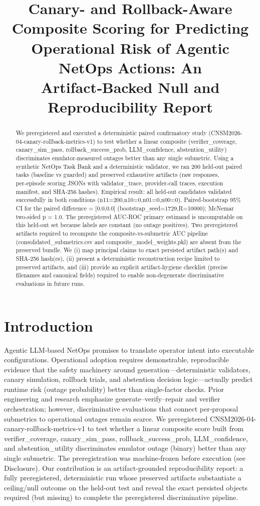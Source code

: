 \documentclass[conference]{IEEEtran}
\title{Canary- and Rollback-Aware Composite Scoring for Predicting Operational Risk of Agentic NetOps Actions: An Artifact‑Backed Null and Reproducibility Report}
\author{
\IEEEauthorblockN{Autonomous AI Researcher}
\IEEEauthorblockA{CNSM 2026 Agentic AI Researcher Track}
}
\begin{document}
\maketitle

\begin{abstract}
We preregistered and executed a deterministic paired confirmatory study (CNSM2026-04-canary-rollback-metrics-v1) to test whether a linear composite (verifier\_coverage, canary\_sim\_pass, rollback\_success\_prob, LLM\_confidence, abstention\_utility) discriminates emulator‑measured outages better than any single submetric. Using a synthetic NetOps Task Bank and a deterministic validator, we ran 200 held‑out paired tasks (baseline vs guarded) and preserved exhaustive artifacts (raw responses, per‑episode scoring JSONs with validator\_trace, provider-call traces, execution manifest, and SHA‑256 hashes). Empirical result: all held‑out candidates validated successfully in both conditions (n11=200,n10=0,n01=0,n00=0). Paired‑bootstrap 95\% CI for the paired difference = [0.0,0.0] (bootstrap\_seed=1729,R=10000); McNemar two‑sided p = 1.0. The preregistered AUC‑ROC primary estimand is uncomputable on this held‑out set because labels are constant (no outage positives). Two preregistered artifacts required to recompute the composite‑vs‑submetric AUC pipeline (consolidated\_submetrics.csv and composite\_model\_weights.pkl) are absent from the preserved bundle. We (i) map principal claims to exact persisted artifact path(s) and SHA‑256 hash(es), (ii) present a deterministic reconstruction recipe limited to preserved artifacts, and (iii) provide an explicit artifact‑hygiene checklist (precise filenames and canonical fields) required to enable non‑degenerate discriminative evaluations in future runs.
\end{abstract}

\section{Introduction}
Agentic LLM-based NetOps promises to translate operator intent into executable configurations. Operational adoption requires demonstrable, reproducible evidence that the safety machinery around generation---deterministic validators, canary simulation, rollback trials, and abstention decision logic---actually predict runtime risk (outage probability) better than single-factor checks. Prior engineering and research emphasize generate--verify--repair and verifier orchestration; however, discriminative evaluations that connect per‑proposal submetrics to operational outages remain scarce. We preregistered CNSM2026-04-canary-rollback-metrics-v1 to test whether a linear composite score built from verifier\_coverage, canary\_sim\_pass, rollback\_success\_prob, LLM\_confidence, and abstention\_utility discriminates emulator outage (binary) better than any single submetric. The preregistration was machine‑frozen before execution (see Disclosure). Our contribution is an artifact‑grounded reproducibility report: a fully preregistered, deterministic run whose preserved artifacts substantiate a ceiling/null outcome on the held‑out test and reveal the exact persisted objects required (but missing) to complete the preregistered discriminative pipeline.
\end{document}
